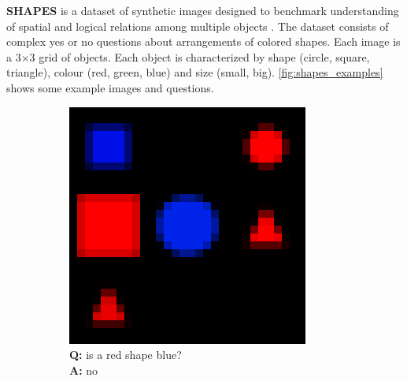 \textbf{SHAPES} is a dataset of synthetic images designed to benchmark understanding of spatial and logical relations among multiple objects \cite{andreas2016neural}. The dataset consists of complex yes or no questions about arrangements of colored shapes. Each image is a 3×3 grid of objects. Each object is characterized by shape (circle, square, triangle), colour (red, green, blue) and size (small, big). \cref{fig:shapes_examples} shows some example images and questions.

\begin{figure}[ht]
  \centering
    \begin{subfigure}[b]{0.24\linewidth}
    \centering
    \includegraphics[width=\linewidth]{images/datasets/shapes0_big.png}
    \caption{\textbf{Q:} is a red shape blue? \\ \textbf{A:} no}
     \end{subfigure}
     \hfill
     \begin{subfigure}[b]{0.24\linewidth}
     \centering

\end{subfigure}
\end{figure}
